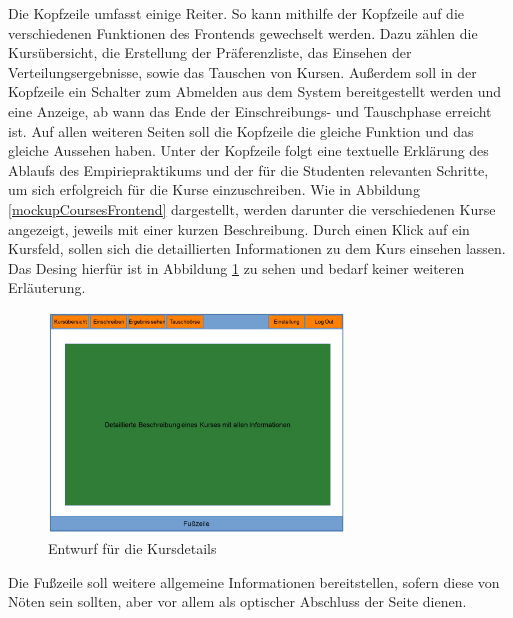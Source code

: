             Die Kopfzeile umfasst einige Reiter.
            So kann mithilfe der Kopfzeile auf die verschiedenen Funktionen des Frontends gewechselt werden. 
            Dazu zählen die Kursübersicht, die Erstellung der Präferenzliste, das Einsehen der Verteilungsergebnisse, sowie das Tauschen von Kursen.
            Außerdem soll in der Kopfzeile ein Schalter zum Abmelden aus dem System bereitgestellt werden und eine Anzeige, ab wann das Ende der Einschreibungs- und Tauschphase erreicht ist.
            Auf allen weiteren Seiten soll die Kopfzeile die gleiche Funktion und das gleiche Aussehen haben.
            Unter der Kopfzeile folgt eine textuelle Erklärung des Ablaufs des Empiriepraktikums und der für die Studenten relevanten Schritte, um sich erfolgreich für die Kurse einzuschreiben.
            Wie in Abbildung \ref{mockupCoursesFrontend} dargestellt, werden darunter die verschiedenen Kurse angezeigt, jeweils mit einer kurzen Beschreibung.
            Durch einen Klick auf ein Kursfeld, sollen sich die detaillierten Informationen zu dem Kurs einsehen lassen.
            Das Desing hierfür ist in Abbildung \ref{mockupDetailsFrontend} zu sehen und bedarf keiner weiteren Erläuterung.
            \begin{figure}[t]
            	\centering
            	\includegraphics[width=0.7\textwidth]{./design/MockUpsFrontend/frontendCoursedetails.png}
            	\caption{Entwurf für die Kursdetails}
            	\label{mockupDetailsFrontend}
            \end{figure}
            Die Fußzeile soll weitere allgemeine Informationen bereitstellen, sofern diese von Nöten sein sollten, aber vor allem als optischer Abschluss der Seite dienen.
